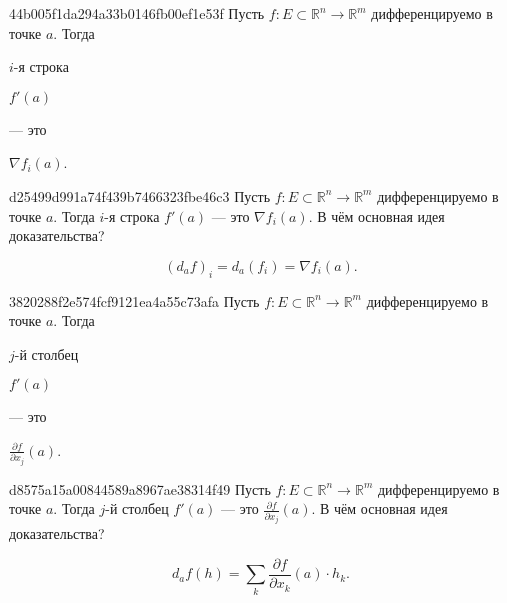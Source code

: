 \begin{note}{44b005f1da294a33b0146fb00ef1e53f}
    Пусть \({ f : E \subset \mathbb R^{n} \to \mathbb R^{m} }\) дифференцируемо в точке \({ a }\).
    Тогда \begin{icloze}{2}\({ i }\)-я строка\end{icloze} \begin{icloze}{3}\({ f'(a) }\)\end{icloze} --- это \begin{icloze}{1}\({ \nabla f_i(a) }\).\end{icloze}
\end{note}

\begin{note}{d25499d991a74f439b7466323fbe46c3}
    Пусть \({ f : E \subset \mathbb R^{n} \to \mathbb R^{m} }\) дифференцируемо в точке \({ a }\).
    Тогда \({ i }\)-я строка \({ f'(a) }\) --- это \({ \nabla f_i(a) }\).
    В чём основная идея доказательства?

    \begin{cloze}{1}
        \[
            (d_{a}f)_i = d_{a}(f_i) = \nabla f_i(a).
        \]
    \end{cloze}
\end{note}

\begin{note}{3820288f2e574fcf9121ea4a55c73afa}
    Пусть \({ f : E \subset \mathbb R^{n} \to \mathbb R^{m} }\) дифференцируемо в точке \({ a }\).
    Тогда \begin{icloze}{2}\({ j }\)-й столбец\end{icloze} \begin{icloze}{3}\({ f'(a) }\)\end{icloze} --- это \begin{icloze}{1}\({ \frac{\partial f}{\partial x_j}(a) }\).\end{icloze}
\end{note}

\begin{note}{d8575a15a00844589a8967ae38314f49}
    Пусть \({ f : E \subset \mathbb R^{n} \to \mathbb R^{m} }\) дифференцируемо в точке \({ a }\).
    Тогда \({ j }\)-й столбец \({ f'(a) }\) --- это \({ \frac{\partial f}{\partial x_j}(a) }\).
    В чём основная идея доказательства?

    \begin{cloze}{1}
        \[
            d_{a}f(h) = \sum_{k}^{} \frac{\partial f}{\partial x_k}(a) \cdot h_k.
        \]
    \end{cloze}
\end{note}

